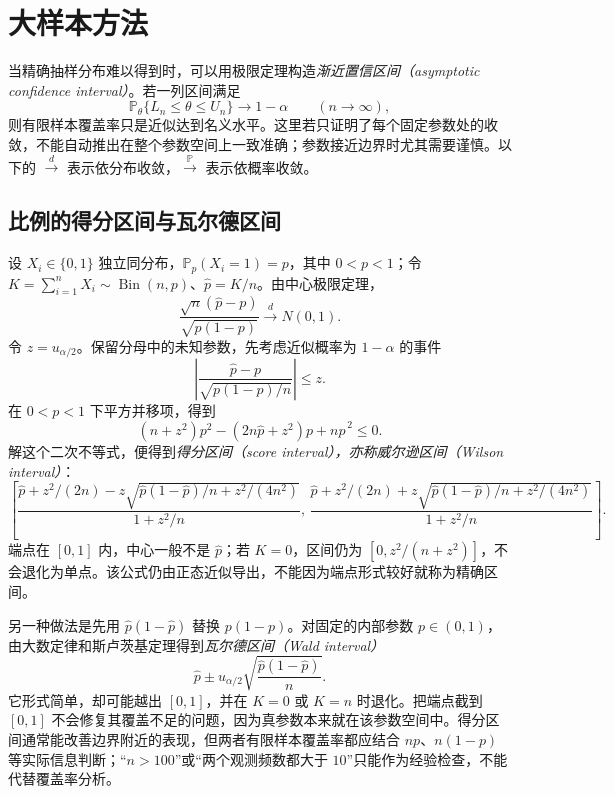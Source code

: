\section{大样本方法}
\label{sec:study-large-sample-intervals}

当精确抽样分布难以得到时，可以用极限定理构造\emph{渐近置信区间（asymptotic confidence interval）}。若一列区间满足
\[
  \mathbb P_\theta\{L_n\le\theta\le U_n\}\longrightarrow1-\alpha
  \qquad(n\to\infty),
\]
则有限样本覆盖率只是近似达到名义水平。这里若只证明了每个固定参数处的收敛，不能自动推出在整个参数空间上一致准确；参数接近边界时尤其需要谨慎。以下的 $\xrightarrow{d}$ 表示依分布收敛，$\xrightarrow{\mathbb P}$ 表示依概率收敛。

\subsection{比例的得分区间与瓦尔德区间}
\label{subsec:study-proportion-intervals}

设 $X_i\in\{0,1\}$ 独立同分布，$\mathbb P_p(X_i=1)=p$，其中 $0<p<1$；令 $K=\sum_{i=1}^nX_i\sim\operatorname{Bin}(n,p)$、$\widehat p=K/n$。由中心极限定理，
\begin{equation}
  \frac{\sqrt n(\widehat p-p)}{\sqrt{p(1-p)}}
  \xrightarrow{d}N(0,1).
  \label{eq:study-proportion-clt}
\end{equation}
令 $z=u_{\alpha/2}$。保留分母中的未知参数，先考虑近似概率为 $1-\alpha$ 的事件
\[
  \left|\frac{\widehat p-p}{\sqrt{p(1-p)/n}}\right|\le z.
\]
在 $0<p<1$ 下平方并移项，得到
\[
  (n+z^2)p^2-(2n\widehat p+z^2)p+n\widehat p^{\,2}\le0.
\]
解这个二次不等式，便得到\emph{得分区间（score interval），亦称威尔逊区间（Wilson interval）}：
\begin{equation}
  \left[
    \frac{\widehat p+z^2/(2n)
          -z\sqrt{\widehat p(1-\widehat p)/n+z^2/(4n^2)}}{1+z^2/n},\,
    \frac{\widehat p+z^2/(2n)
          +z\sqrt{\widehat p(1-\widehat p)/n+z^2/(4n^2)}}{1+z^2/n}
  \right].
  \label{eq:study-wilson-ci}
\end{equation}
端点在 $[0,1]$ 内，中心一般不是 $\widehat p$；若 $K=0$，区间仍为 $[0,z^2/(n+z^2)]$，不会退化为单点。该公式仍由正态近似导出，不能因为端点形式较好就称为精确区间。

另一种做法是先用 $\widehat p(1-\widehat p)$ 替换 $p(1-p)$。对固定的内部参数 $p\in(0,1)$，由大数定律和斯卢茨基定理得到\emph{瓦尔德区间（Wald interval）}
\begin{equation}
  \widehat p\pm u_{\alpha/2}
       \sqrt{\frac{\widehat p(1-\widehat p)}n}.
  \label{eq:study-proportion-wald-ci}
\end{equation}
它形式简单，却可能越出 $[0,1]$，并在 $K=0$ 或 $K=n$ 时退化。把端点截到 $[0,1]$ 不会修复其覆盖不足的问题，因为真参数本来就在该参数空间中。得分区间通常能改善边界附近的表现，但两者有限样本覆盖率都应结合 $np$、$n(1-p)$ 等实际信息判断；“$n>100$”或“两个观测频数都大于 $10$”只能作为经验检查，不能代替覆盖率分析。

